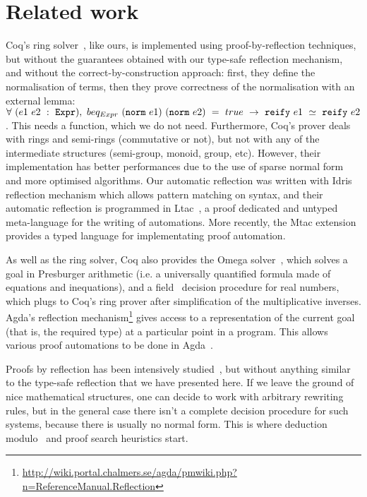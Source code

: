 \section{Related work}
\label{sect:relatedWork}

Coq's ring solver~\cite{Coq2005}, like ours, is
implemented using proof-by-reflection techniques, but without the guarantees obtained with
our type-safe reflection mechanism, and without the correct-by-construction
approach: first, they define the normalisation of terms, then
they prove correctness of the normalisation with an external lemma:
$\forall\ (e1\ e2\ :\ \code{Expr}),\ beq_{Expr}\ (\code{norm}\ e1)\
(\code{norm}\ e2)\ =\ true\ \rightarrow\ \ e1\ \simeq\
\code{reify}\ e2$.
This needs a \code{reify} function, which we do not need.
Furthermore, Coq's prover deals
with rings and semi-rings (commutative or not), but not with any of the
intermediate structures (semi-group, monoid, group, etc).
However,
their implementation has better performances due to the use of sparse normal
form and more optimised algorithms.  Our automatic reflection was written with
Idris reflection mechanism which allows pattern matching on syntax, and
their automatic reflection is programmed in Ltac~\cite{DelahayeLTac}, a proof
dedicated and untyped meta-language for the writing of automations.
More recently, the Mtac extension~\cite{Ziliani13} provides a
typed language for implementating proof automation.

As well as the ring solver, Coq also provides the
Omega solver~\cite{Cregut04}, which solves a goal in Presburger arithmetic
(i.e. a universally quantified formula made of equations and inequations), and
a field~\cite{DelahayeField} decision procedure for real numbers, which plugs
to Coq's ring prover after simplification of the multiplicative inverses.
Agda's reflection
mechanism\footnote{\url{http://wiki.portal.chalmers.se/agda/pmwiki.php?n=ReferenceManual.Reflection}}
gives access to a representation of the current goal (that is,
the required type) at a particular point in a program.
This allows various proof automations to be done in
Agda~\cite{DBLP:conf/mpc/KokkeS15,Lindblad04}. 

Proofs by reflection has been intensively
studied~\cite{ChlipalaBook,Malecha14}, but without anything similar to
the type-safe reflection that we have presented here.
%
If we leave the ground of nice mathematical structures, one can decide
to work with arbitrary rewriting rules, but in the general case there isn't a
complete decision procedure for such systems, because there is usually no
normal form. This is where deduction modulo~\cite{Dowek03,DelahayeModulo} and
proof search heuristics start.

